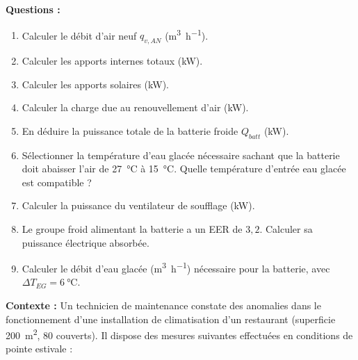 \bigskip
\textbf{Questions :}

\begin{enumerate}
  \item Calculer le débit d'air neuf $q_{v,AN}$ (\si{\metre\cubed\per\hour}).
  \item Calculer les apports internes totaux (\si{\kilo\watt}).
  \item Calculer les apports solaires (\si{\kilo\watt}).
  \item Calculer la charge due au renouvellement d'air (\si{\kilo\watt}).
  \item En déduire la puissance totale de la batterie froide $Q_{batt}$ (\si{\kilo\watt}).
  \item Sélectionner la température d'eau glacée nécessaire sachant que la batterie doit abaisser l'air de \SI{27}{\celsius} à \SI{15}{\celsius}. Quelle température d'entrée eau glacée est compatible ?
  \item Calculer la puissance du ventilateur de soufflage (\si{\kilo\watt}).
  \item Le groupe froid alimentant la batterie a un EER de $3{,}2$. Calculer sa puissance électrique absorbée.
  \item Calculer le débit d'eau glacée (\si{\metre\cubed\per\hour}) nécessaire pour la batterie, avec $\Delta T_{EG} = \SI{6}{\celsius}$.
\end{enumerate}


\textbf{Contexte :}
Un technicien de maintenance constate des anomalies dans le fonctionnement d'une installation
de climatisation d'un restaurant (superficie \SI{200}{\metre\squared}, 80 couverts).
Il dispose des mesures suivantes effectuées en conditions de pointe estivale :

